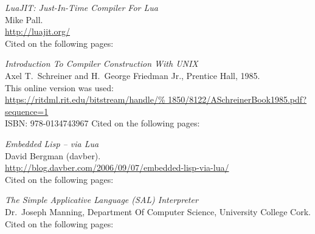 \begin{thebibliography}{9}
  \emph{LuaJIT: Just-In-Time Compiler For Lua} \\
  Mike Pall. \\
  \url{http://luajit.org/} \\
  Cited on the following pages:

  \emph{Introduction To Compiler Construction With UNIX} \\
  Axel T.\ Schreiner and H.\ George Friedman Jr.,
  Prentice Hall,
  1985. \\
  This online version was used: \\
  \url{https://ritdml.rit.edu/bitstream/handle/%
       1850/8122/ASchreinerBook1985.pdf?sequence=1} \\
  ISBN: 978-0134743967
  Cited on the following pages:

  \emph{Embedded Lisp -- via Lua} \\
  David Bergman (davber). \\
  \url{http://blog.davber.com/2006/09/07/embedded-lisp-via-lua/} \\
  Cited on the following pages: 
  
  \emph{The Simple Applicative Language (SAL) Interpreter} \\
  Dr.\ Joseph Manning,
  Department Of Computer Science,
  University College Cork. \\
  Cited on the following pages: 

\end{thebibliography}
